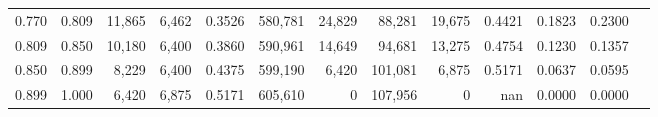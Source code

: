 \begin{tabular}{rrrrrrrrrrrrr}
0.770 & 0.809 &  11,865 & 6,462 &                                     0.3526 & 580,781 &  24,829 &  88,281 &  19,675 & 0.4421 & 0.1823 & 0.2300 \\
0.809 & 0.850 &  10,180 & 6,400 &                                     0.3860 & 590,961 &  14,649 &  94,681 &  13,275 & 0.4754 & 0.1230 & 0.1357 \\
0.850 & 0.899 &   8,229 & 6,400 &                                     0.4375 & 599,190 &   6,420 & 101,081 &   6,875 & 0.5171 & 0.0637 & 0.0595 \\
0.899 & 1.000 &   6,420 & 6,875 &                                     0.5171 & 605,610 &       0 & 107,956 &       0 &    nan & 0.0000 & 0.0000 \\
\bottomrule
\end{tabular}
